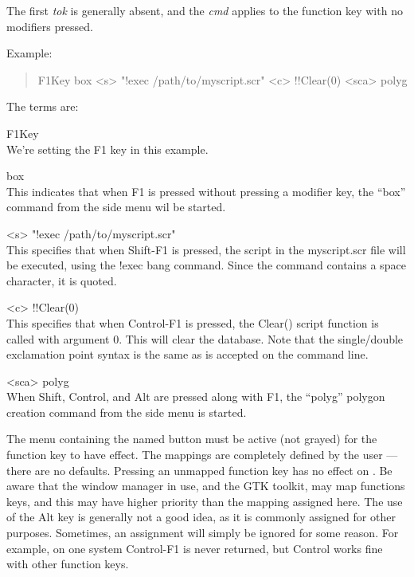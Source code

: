 \begin{description}
The first {\it tok} is generally absent, and the {\it cmd} applies to
the function key with no modifiers pressed.

Example:
\begin{quote}
\vt F1Key box <s> "!exec /path/to/myscript.scr" <c> !!Clear(0) <sca> polyg
\end{quote}

The terms are:
\begin{description}
\item{\vt F1Key}\\
We're setting the {\kb F1} key in this example.

\item{\vt box}\\
This indicates that when {\kb F1} is pressed without pressing a
modifier key, the ``{\vt box}'' command from the side menu wil be
started.

\item{\vt <s> "!exec /path/to/myscript.scr"}\\
This specifies that when {\kb Shift-F1} is pressed, the script in the
{\vt myscript.scr} file will be executed, using the {\cb !exec} bang
command.  Since the command contains a space character, it is quoted.

\item{\vt <c> !!Clear(0)}\\
This specifies that when {\kb Control-F1} is pressed, the {\vt Clear()}
script function is called with argument 0.  This will clear the
database.  Note that the single/double exclamation point syntax is the
same as is accepted on the command line.

\item{\vt <sca> polyg}\\
When {\kb Shift}, {\kb Control}, and {\kb Alt} are pressed along with
{\kb F1}, the ``{\vt polyg}'' polygon creation command from the side
menu is started.
\end{description}

The menu containing the named button must be active (not grayed) for
the function key to have effect.  The mappings are completely defined
by the user --- there are no defaults.  Pressing an unmapped function
key has no effect on {\Xic}.  Be aware that the window manager in use,
and the GTK toolkit, may map functions keys, and this may have higher
priority than the mapping assigned here.  The use of the {\kb Alt} key
is generally not a good idea, as it is commonly assigned for other
purposes.  Sometimes, an assignment will simply be ignored for some
reason.  For example, on one system {\kb Control-F1} is never
returned, but {\kb Control} works fine with other function keys. 
\end{description}


